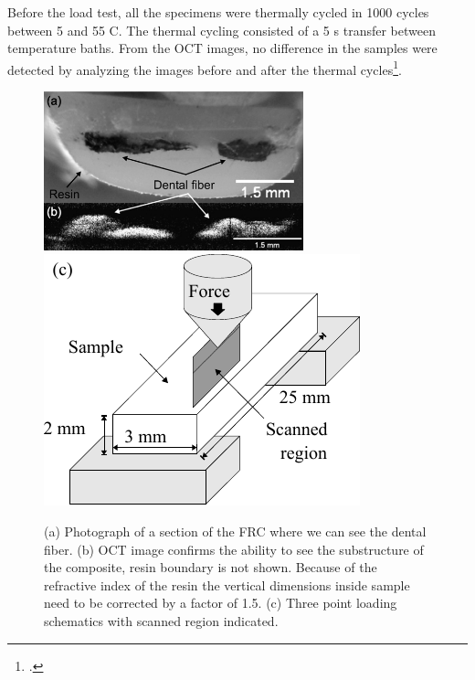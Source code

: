 \documentclass[12pt,twoside,english]{book}
\renewcommand{\~}{\perispomeni}%
\numberwithin{equation}{section}
\numberwithin{figure}{section}
\begin{document}
Before the load test, all the specimens were thermally cycled in 1000 cycles between 5 and 55 \textdegree{}C. The thermal cycling consisted of a 5 s transfer between temperature baths. From the OCT images, no difference in the samples were detected by analyzing the images before and after the thermal cycles\footcite{Kyotoku:2007p788}.
\begin{figure}[h]
\centering{}\includegraphics[height=4.6cm]{frc-1}
\includegraphics{FRC-setup}
\caption{(a) Photograph of a section of the FRC where we can see the dental fiber. (b) OCT image confirms the ability to see the substructure of the composite, resin boundary is not shown. Because of the refractive index of the resin the vertical dimensions inside sample need to be corrected by a factor of 1.5. (c) Three point loading schematics with scanned region indicated.\label{fig:FRC photo}}
\end{figure}
\end{document}

